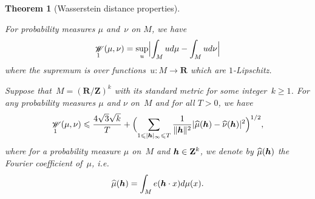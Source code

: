 \documentclass[12pt]{amsart}
\renewcommand{\mathcal}{\mathscr}
\renewcommand{\leq}{\leqslant}
\renewcommand{\geq}{\geqslant}
\newcommand{\uple}[1]{\text{\boldmath${#1}$}}
\newcommand{\Zz}{\mathbf{Z}}
\newcommand{\Rr}{\mathbf{R}}
\DeclareMathOperator{\wass}{\mathcal{W}}
\theoremstyle{plain}
\newtheorem{theorem}{Theorem}[section]
\theoremstyle{remark}
\theoremstyle{definition}
\renewcommand{\geq}{\geqslant}
\renewcommand{\leq}{\leqslant}
\begin{document}
\begin{theorem}[Wasserstein distance properties]
\begin{enumth}
  \item For probability measures $\mu$ and~$\nu$ on $M$, we have
    \[
      \wass_1(\mu,\nu)=\sup_{u}\Bigl|\int_{M}ud\mu- \int_{M}ud\nu\Bigr|
    \]
    where the supremum is over functions~$u\colon M\to \Rr$ which are
    $1$-Lipschitz.

  \item Suppose that~$M=(\Rr/\Zz)^k$ with its standard metric for some
    integer~$k\geq 1$. For any probability measures $\mu$ and $\nu$
    on~$M$ and for all $T >0$, we have
    \begin{equation}\label{eq-bl}
      \wass_1(\mu,\nu)\leq \frac{4\sqrt{3}\sqrt{k}}{T} +\Bigl(\sum_{1\leq
        |\uple{h}|_{\infty}\leq T} \frac{1}{\|\uple{h}\|^2}
      |\widehat{\mu}(\uple{h})-\widehat{\nu}(\uple{h})|^2
      \Bigr)^{1/2},
    \end{equation}
    where for a probability measure $\mu$ on~$M$ and
    $\uple{h}\in\Zz^k$, we denote by $\widehat{\mu}(\uple{h})$ the
    Fourier coefficient of~$\mu$, i.e.
    \[
      \widehat{\mu}(\uple{h})=\int_{M}e(\uple{h}\cdot x)d\mu(x).
    \]
  \end{enumth}
\end{theorem}
\end{document}
